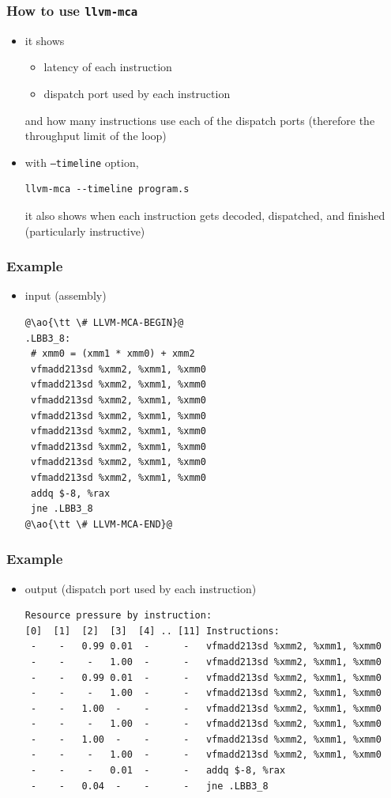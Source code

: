 \documentclass[12pt,dvipdfmx]{beamer}
\newcommand{\ao}[1]{{\color{blue}#1}}
\begin{document}
\begin{frame}[fragile]
  \frametitle{How to use {\tt llvm-mca}}
  \begin{itemize}
  \item it shows 
    \begin{itemize}
    \item latency of each instruction
    \item dispatch port used by each instruction
    \end{itemize}
    and how many instructions use each of the dispatch ports
    (therefore the throughput limit of the loop)
  \item with {\tt --timeline} option, 
\begin{lstlisting}
llvm-mca --timeline program.s    
\end{lstlisting}
it also shows when each instruction gets decoded, dispatched, and finished
(particularly instructive)
\end{itemize}
\end{frame}


\begin{frame}[fragile]
  \frametitle{Example}
  \begin{itemize}
  \item input (assembly)
{\tiny\begin{lstlisting}
@\ao{\tt \# LLVM-MCA-BEGIN}@
.LBB3_8:
 # xmm0 = (xmm1 * xmm0) + xmm2
 vfmadd213sd %xmm2, %xmm1, %xmm0
 vfmadd213sd %xmm2, %xmm1, %xmm0
 vfmadd213sd %xmm2, %xmm1, %xmm0
 vfmadd213sd %xmm2, %xmm1, %xmm0
 vfmadd213sd %xmm2, %xmm1, %xmm0
 vfmadd213sd %xmm2, %xmm1, %xmm0
 vfmadd213sd %xmm2, %xmm1, %xmm0
 vfmadd213sd %xmm2, %xmm1, %xmm0
 addq $-8, %rax
 jne .LBB3_8
@\ao{\tt \# LLVM-MCA-END}@
\end{lstlisting} %
}
\end{itemize}
\end{frame}

\begin{frame}[fragile]
  \frametitle{Example}
  \begin{itemize}
\item output (dispatch port used by each instruction)
{\tiny\begin{lstlisting}
Resource pressure by instruction:
[0]  [1]  [2]  [3]  [4] .. [11] Instructions:
 -    -   0.99 0.01  -      -   vfmadd213sd %xmm2, %xmm1, %xmm0
 -    -    -   1.00  -      -   vfmadd213sd %xmm2, %xmm1, %xmm0
 -    -   0.99 0.01  -      -   vfmadd213sd %xmm2, %xmm1, %xmm0
 -    -    -   1.00  -      -   vfmadd213sd %xmm2, %xmm1, %xmm0
 -    -   1.00  -    -      -   vfmadd213sd %xmm2, %xmm1, %xmm0
 -    -    -   1.00  -      -   vfmadd213sd %xmm2, %xmm1, %xmm0
 -    -   1.00  -    -      -   vfmadd213sd %xmm2, %xmm1, %xmm0
 -    -    -   1.00  -      -   vfmadd213sd %xmm2, %xmm1, %xmm0
 -    -    -   0.01  -      -   addq $-8, %rax
 -    -   0.04  -    -      -   jne .LBB3_8
\end{lstlisting}%
}
\end{itemize}
\end{frame}
\end{document}
